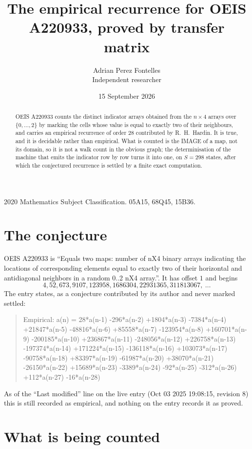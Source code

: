 \documentclass[11pt,a4paper]{article}
\title{The empirical recurrence for OEIS A220933, proved by transfer matrix}
\author{Adrian Perez Fontelles\\ \small Independent researcher}
\date{15 September 2026}
\theoremstyle{plain}
\theoremstyle{definition}
\begin{document}
\maketitle

\begin{abstract}
OEIS A220933 counts the distinct indicator arrays obtained from the $n\times4$ arrays over
$\{0,\dots,2\}$ by marking the cells whose value is equal to exactly two of their neighbours, and carries an
empirical recurrence of order $28$ contributed by R.~H.~Hardin. It is true, and it is
decidable rather than empirical. What is counted is the IMAGE of a map, not its domain, so it
is not a walk count in the obvious graph; the determinisation of the machine that emits the
indicator row by row turns it into one, on $S=298$ states, after which the conjectured
recurrence is settled by a finite exact computation.
\end{abstract}

\noindent\small 2020 Mathematics Subject Classification. 05A15, 68Q45, 15B36.\normalsize

\section{The conjecture}

OEIS A220933 is ``Equals two maps: number of nX4 binary arrays indicating the locations of corresponding elements equal to exactly two of their horizontal and antidiagonal neighbors in a random 0..2 nX4 array.''. It has offset $1$ and begins
\[
4, 52, 673, 9107, 123958, 1686304, 22931365, 311813067,\ \dots
\]
The entry states, as a conjecture contributed by its author and never marked settled:
\begin{quote}
Empirical: a(n) = 28*a(n-1) -296*a(n-2) +1804*a(n-3) -7384*a(n-4) +21847*a(n-5) -48816*a(n-6) +85558*a(n-7) -123954*a(n-8) +160701*a(n-9) -200185*a(n-10) +236867*a(n-11) -248056*a(n-12) +226758*a(n-13) -197374*a(n-14) +171224*a(n-15) -136118*a(n-16) +103073*a(n-17) -90758*a(n-18) +83397*a(n-19) -61987*a(n-20) +38070*a(n-21) -26150*a(n-22) +15689*a(n-23) -3389*a(n-24) -92*a(n-25) -312*a(n-26) +112*a(n-27) -16*a(n-28)
\end{quote}
As of the ``Last modified'' line on the live entry (Oct 03 2025 19:08:15, revision 8) this is still
recorded as empirical, and nothing on the entry records it as proved.

\section{What is being counted}
\end{document}
